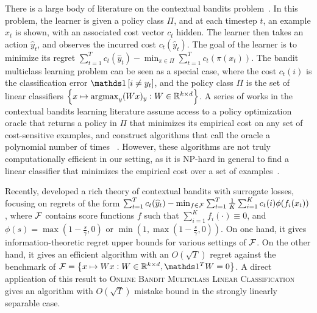 
There is a large body of literature on the contextual bandits
problem~\citep{Auer-2003, Langford-Zhang-2008}. In this problem, the learner is
given a policy class $\Pi$, and at each timestep $t$, an example $x_t$ is shown,
with an associated cost vector $c_t$ hidden. The learner then takes an action
$\widehat{y}_t$, and observes the incurred cost $c_t(\widehat{y}_t)$. The goal
of the learner is to minimize its regret $\sum_{t=1}^T c_t(\widehat{y}_t) -
\min_{\pi \in \Pi} \sum_{t=1}^T c_t(\pi(x_t))$. The bandit multiclass learning
problem can be seen as a special case, where the cost $c_t(i)$ is the
classification error $\indicator{i \neq y_t}$, and the policy class $\Pi$ is the
set of linear classifiers $\cbr{x \mapsto \argmax_y (Wx)_y: W \in \R^{k \times
d}}$. A series of works in the contextual bandits learning literature assume
access to a policy optimization oracle that returns a policy in $\Pi$ that
minimizes its empirical cost on any set of cost-sensitive examples, and
construct algorithms that call the oracle a polynomial number of times%
~\citep{Dudik-Hsu-Kale-Karampatziakis-Langford-Reyzin-Zhang-2011,
Agarwal-Hsu-Kale-Langford-Li-Schapire-2014, Rakhlin-Sridharan-2016,
Syrgkanis-Krishnamurthy-Schapire-2016,
Syrgkanis-Luo-Krishnamurthy-Schapire-2016}. However, these algorithms are not
truly computationally efficient in our setting, as it is NP-hard in general to
find a linear classifier that minimizes the empirical cost over a set of
examples~\citep{Arora-Babai-Stern-Sweedyk-1997}.

Recently, \citet{Foster-Krishnamurthy-2018} developed a rich theory of
contextual bandits with surrogate losses, focusing on regrets of the form
$\sum_{t=1}^T c_t(\widehat{y}_t) - \min_{f \in \mathcal{F}} \sum_{t=1}^T \frac{1}{K}
\sum_{i=1}^K c_t(i) \phi( f_i(x_t) )$, where $\mathcal{F}$ contains score functions
$f$ such that $\sum_{i=1}^K f_i(\cdot) \equiv 0$, and $\phi(s) = \max(1 - \frac
s \gamma, 0)$ or $\min(1, \max(1 - \frac s \gamma, 0))$. On one hand, it gives
information-theoretic regret upper bounds for various settings of $\mathcal{F}$. On
the other hand, it gives an efficient algorithm with an $O(\sqrt{T})$ regret
against the benchmark of $\calF = \cbr{x \mapsto W x: W \in \R^{k \times d},
\one^T W = 0}$. A direct application of this result to \textsc{Online Bandit
Multiclass Linear Classification} gives an algorithm with $O(\sqrt{T})$ mistake
bound in the strongly linearly separable case.

